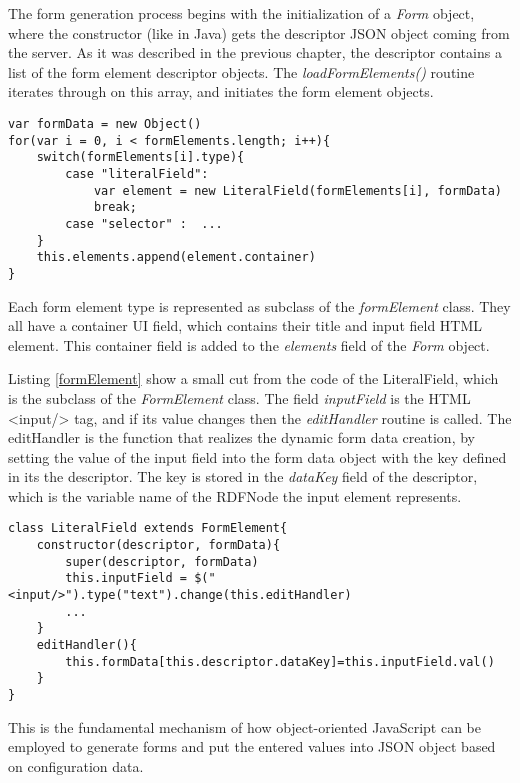 The form generation process begins with the initialization of a \textit{Form} object, where the constructor (like in Java) gets the descriptor JSON object coming from the server. As it was described in the previous chapter, the descriptor contains a list of the form element descriptor objects. The \textit{loadFormElements()} routine iterates through on this array, and initiates the form element objects.

\begin{lstlisting}[basicstyle=\footnotesize, frame=single, caption={Form generation based on configuration data}, label=formGen captionpos=b, belowskip=1em, aboveskip=2em]
var formData = new Object()
for(var i = 0, i < formElements.length; i++){
	switch(formElements[i].type){
		case "literalField":
			var element = new LiteralField(formElements[i], formData)
			break;
		case "selector" :  ...
	}
	this.elements.append(element.container)
}	
\end{lstlisting}


Each form element type is represented as subclass of the \textit{formElement} class. They all have a container UI field, which contains their title and input field HTML element. This container field is added to the \textit{elements} field of the \textit{Form} object.

Listing \ref{formElement} show a small cut from the code of the LiteralField, which is the subclass of the \textit{FormElement} class. The field \textit{inputField} is the HTML <input/> tag, and if its value changes then the \textit{editHandler} routine is called. The editHandler is the function that realizes the dynamic form data creation, by setting the value of the input field into the form data object with the key defined in its the descriptor. The key is stored in the \textit{dataKey} field of the descriptor, which is the variable name of the RDFNode the input element represents.

\begin{lstlisting}[basicstyle=\footnotesize, frame=single, caption={Form element}, label=formElement, captionpos=b, belowskip=1em, aboveskip=2em]
class LiteralField extends FormElement{
	constructor(descriptor, formData){
		super(descriptor, formData)
		this.inputField = $("<input/>").type("text").change(this.editHandler)
		...
	}
	editHandler(){
		this.formData[this.descriptor.dataKey]=this.inputField.val() 
	}			
}
\end{lstlisting}

This is the fundamental mechanism of how object-oriented JavaScript can be employed to generate forms and put the entered values into JSON object based on configuration data.

